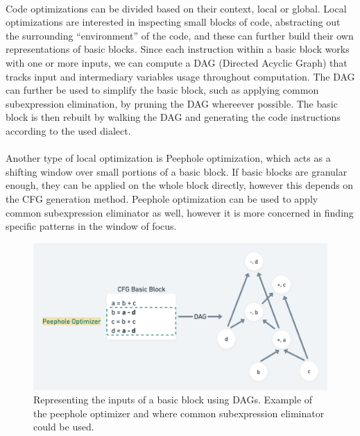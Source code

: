 \paragraph*{}
Code optimizations can be divided based on their context, local or global. Local optimizations are interested in inspecting small blocks of code, abstracting out the surrounding ``environment'' of the code, and these can further build their own representations of basic blocks. Since each instruction within a basic block works with one or more inputs, we can compute a DAG (Directed Acyclic Graph) that tracks input and intermediary variables usage throughout computation. The DAG can further be used to simplify the basic block, such as applying common subexpression elimination, by pruning the DAG whereever possible. The basic block is then rebuilt by walking the DAG and generating the code instructions according to the used dialect.

\paragraph*{}
Another type of local optimization is Peephole optimization, which acts as a shifting window over small portions of a basic block. If basic blocks are granular enough, they can be applied on the whole block directly, however this depends on the CFG generation method. Peephole optimization can be used to apply common subexpression eliminator as well, however it is more concerned in finding specific patterns in the window of focus.

\begin{figure}
    \centering
    \includegraphics[width=15cm]{images/dag_peephole.png}
    \caption{Representing the inputs of a basic block using DAGs. Example of the peephole optimizer and where common subexpression eliminator could be used.}
    \label{fig:dag-peephole-example}
\end{figure}


